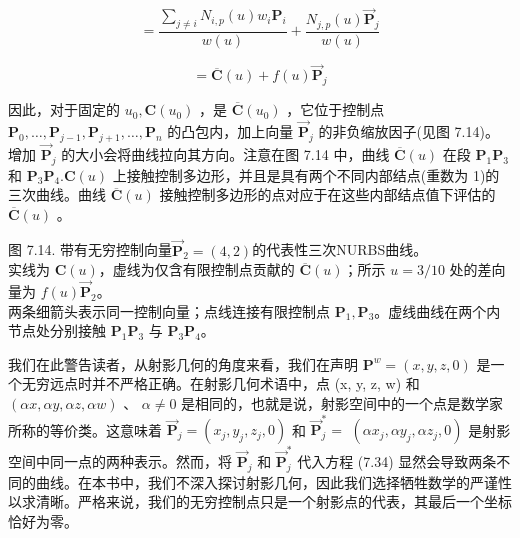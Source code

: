 \documentclass[../main.tex]{subfiles}
\begin{document}
\[
= \frac{\mathop{\sum }\limits_{{j \neq  i}}{N}_{i,p}\left( u\right) {w}_{i}{\mathbf{P}}_{i}}{w\left( u\right) } + \frac{{N}_{j,p}\left( u\right) {\overrightarrow{\mathbf{P}}}_{j}}{w\left( u\right) }
\]

\[
= \overline{\mathbf{C}}\left( u\right)  + f\left( u\right) {\overrightarrow{\mathbf{P}}}_{j} \tag{7.34}
\]

因此，对于固定的 \({u}_{0},\mathbf{C}\left( {u}_{0}\right)\) ，是 \(\overline{\mathbf{C}}\left( {u}_{0}\right)\) ，它位于控制点 \({\mathbf{P}}_{0},\ldots ,{\mathbf{P}}_{j - 1},{\mathbf{P}}_{j + 1},\ldots ,{\mathbf{P}}_{n}\) 的凸包内，加上向量 \({\overrightarrow{\mathbf{P}}}_{j}\) 的非负缩放因子(见图 7.14)。增加 \({\overrightarrow{\mathbf{P}}}_{j}\) 的大小会将曲线拉向其方向。注意在图 7.14 中，曲线 \(\overline{\mathbf{C}}\left( u\right)\) 在段 \({\mathbf{P}}_{1}{\mathbf{P}}_{3}\) 和 \({\mathbf{P}}_{3}{\mathbf{P}}_{4}.\mathbf{C}\left( u\right)\) 上接触控制多边形，并且是具有两个不同内部结点(重数为 1)的三次曲线。曲线 \(\overline{\mathbf{C}}\left( u\right)\) 接触控制多边形的点对应于在这些内部结点值下评估的 \(\overline{\mathbf{C}}\left( u\right)\) 。

\begin{center}
\begin{minipage}{22cm}
\vspace*{.6\baselineskip}
\centering
{}
\par\smallskip
图 7.14. 带有无穷控制向量$\overrightarrow{\mathbf P}_2=(4,2)$的代表性三次NURBS曲线。\\
实线为 $\mathbf C(u)$，虚线为仅含有限控制点贡献的 $\overline{\mathbf C}(u)$；所示 $u=3/10$ 处的差向量为 $f(u)\overrightarrow{\mathbf P}_2$。\\
两条细箭头表示同一控制向量；点线连接有限控制点 $\mathbf P_1,\mathbf P_3$。虚线曲线在两个内节点处分别接触 $\mathbf P_1\mathbf P_3$ 与 $\mathbf P_3\mathbf P_4$。
\end{minipage}
\end{center}

我们在此警告读者，从射影几何的角度来看，我们在声明 \({\mathbf{P}}^{w} = \left( {x,y,z,0}\right)\) 是一个无穷远点时并不严格正确。在射影几何术语中，点 (x, y, z, w) 和 \(\left( {{\alpha x},{\alpha y},{\alpha z},{\alpha w}}\right)\) 、 \(\alpha  \neq  0\) 是相同的，也就是说，射影空间中的一个点是数学家所称的等价类。这意味着 \({\overrightarrow{\mathbf{P}}}_{j} = \left( {{x}_{j},{y}_{j},{z}_{j},0}\right)\) 和 \({\overrightarrow{\mathbf{P}}}_{j}^{ * } =\)  \(\left( {\alpha {x}_{j},\alpha {y}_{j},\alpha {z}_{j},0}\right)\) 是射影空间中同一点的两种表示。然而，将 \({\overrightarrow{\mathbf{P}}}_{j}\) 和 \({\overrightarrow{\mathbf{P}}}_{j}^{ * }\) 代入方程 (7.34) 显然会导致两条不同的曲线。在本书中，我们不深入探讨射影几何，因此我们选择牺牲数学的严谨性以求清晰。严格来说，我们的无穷控制点只是一个射影点的代表，其最后一个坐标恰好为零。
\end{document}
